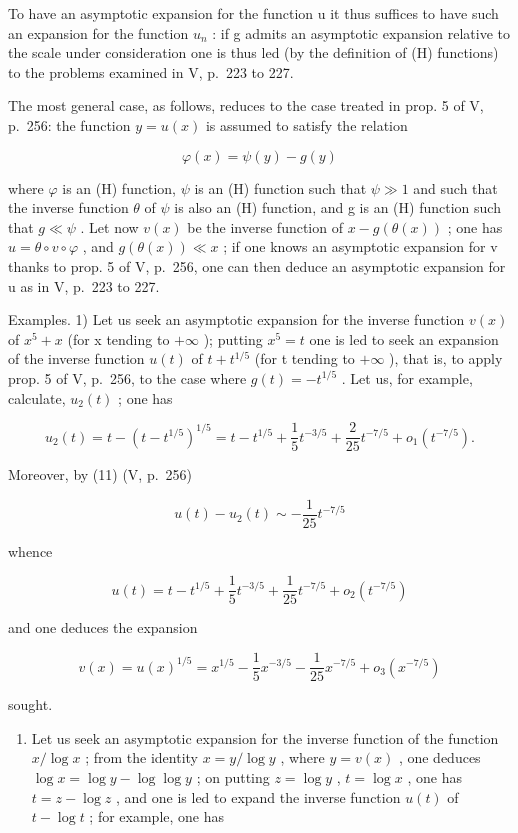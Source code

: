 To have an asymptotic expansion for the function u it thus suffices to have such an expansion for the function \(u_{n}\) : if g admits an asymptotic expansion relative to the scale under consideration one is thus led (by the definition of (H) functions) to the problems examined in V, p.~223 to 227.

The most general case, as follows, reduces to the case treated in prop. 5 of V, p.~256: the function \(y = u(x)\) is assumed to satisfy the relation

\[
\varphi (x) = \psi (y) - g (y)\tag{15}
\]

where \(\varphi\) is an (H) function, \(\psi\) is an (H) function such that \(\psi \gg 1\) and such that the inverse function \(\theta\) of \(\psi\) is also an (H) function, and g is an (H) function such that \(g \ll \psi\) . Let now \(v(x)\) be the inverse function of \(x - g(\theta(x))\) ; one has \(u = \theta \circ v \circ \varphi\) , and \(g(\theta(x)) \ll x\) ; if one knows an asymptotic expansion for v thanks to prop. 5 of V, p.~256, one can then deduce an asymptotic expansion for u as in V, p.~223 to 227.

Examples. 1) Let us seek an asymptotic expansion for the inverse function \(v(x)\) of \(x^{5} + x\) (for x tending to \(+\infty\) ); putting \(x^{5} = t\) one is led to seek an expansion of the inverse function \(u(t)\) of \(t + t^{1/5}\) (for t tending to \(+\infty\) ), that is, to apply prop. 5 of V, p.~256, to the case where \(g(t) = -t^{1/5}\) . Let us, for example, calculate, \(u_{2}(t)\) ; one has

\[
u _ {2} (t) = t - \left(t - t ^ {1 / 5}\right) ^ {1 / 5} = t - t ^ {1 / 5} + \frac {1}{5} t ^ {- 3 / 5} + \frac {2}{2 5} t ^ {- 7 / 5} + o _ {1} \left(t ^ {- 7 / 5}\right).
\]

Moreover, by (11) (V, p.~256)

\[
u (t) - u _ {2} (t) \sim - \frac {1}{2 5} t ^ {- 7 / 5}
\]

whence

\[
u (t) = t - t ^ {1 / 5} + \frac {1}{5} t ^ {- 3 / 5} + \frac {1}{2 5} t ^ {- 7 / 5} + o _ {2} \left(t ^ {- 7 / 5}\right)
\]

and one deduces the expansion

\[
v (x) = u (x) ^ {1 / 5} = x ^ {1 / 5} - \frac {1}{5} x ^ {- 3 / 5} - \frac {1}{2 5} x ^ {- 7 / 5} + o _ {3} \left(x ^ {- 7 / 5}\right)
\]

sought.

\begin{enumerate}
\def\labelenumi{\arabic{enumi})}
\setcounter{enumi}{1}
\tightlist
\item
  Let us seek an asymptotic expansion for the inverse function of the function \(x/\log x\) ; from the identity \(x = y/\log y\) , where \(y = v(x)\) , one deduces \(\log x = \log y - \log \log y\) ; on putting \(z = \log y\) , \(t = \log x\) , one has \(t = z - \log z\) , and one is led to expand the inverse function \(u(t)\) of \(t - \log t\) ; for example, one has
\end{enumerate}

